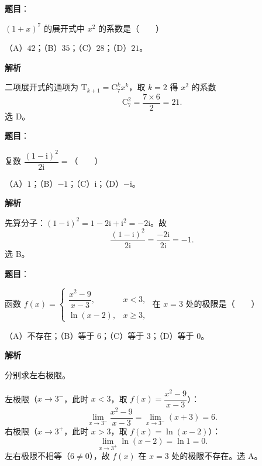 
\begin{answer}

\textbf{题目}：

$(1+x)^7$ 的展开式中 $x^2$ 的系数是\mbox{（　　）}

（A）$42$；（B）$35$；（C）$28$；（D）$21$。

\textbf{解析}

二项展开式的通项为 $\mathrm T_{k+1}=\mathrm C_7^kx^k$，取 $k=2$ 得 $x^2$ 的系数
\nopagebreak[4]
\[\mathrm C_7^2=\frac{7\times6}{2}=21.\]
选 D。


\end{answer}
\begin{answer}

\textbf{题目}：

复数 $\dfrac{(1-\mathrm i)^2}{2\mathrm i}=$\mbox{（　　）}

（A）$1$；（B）$-1$；（C）$\mathrm i$；（D）$-\mathrm i$。

\textbf{解析}

先算分子：$(1-\mathrm i)^2=1-2\mathrm i+\mathrm i^2=-2\mathrm i$。故
\nopagebreak[4]
\[\frac{(1-\mathrm i)^2}{2\mathrm i}=\frac{-2\mathrm i}{2\mathrm i}=-1.\]
选 B。


\end{answer}
\begin{answer}

\textbf{题目}：

函数 $f(x)=\begin{cases}\dfrac{x^2-9}{x-3},&x<3,\\[4pt]\ln(x-2),&x\geqslant3,\end{cases}$ 在 $x=3$ 处的极限是\mbox{（　　）}

（A）不存在；（B）等于 $6$；（C）等于 $3$；（D）等于 $0$。

\textbf{解析}

分别求左右极限。

左极限（$x\to3^-$，此时 $x<3$，取 $f(x)=\dfrac{x^2-9}{x-3}$）：
\nopagebreak[4]
\[\lim_{x\to3^-}\frac{x^2-9}{x-3}=\lim_{x\to3^-}(x+3)=6.\]
右极限（$x\to3^+$，此时 $x>3$，取 $f(x)=\ln(x-2)$）：
\nopagebreak[4]
\[\lim_{x\to3^+}\ln(x-2)=\ln1=0.\]
左右极限不相等（$6\neq0$），故 $f(x)$ 在 $x=3$ 处的极限不存在。选 A。


\end{answer}
